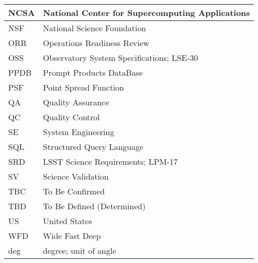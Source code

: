 \begin{longtable}{p{}p{}}
NCSA & National Center for Supercomputing Applications \\\hline
NSF & National Science Foundation \\\hline
ORR & Operations Readiness Review \\\hline
OSS & Observatory System Specifications; LSE-30 \\\hline
PPDB & Prompt Products DataBase \\\hline
PSF & Point Spread Function \\\hline
QA & Quality Assurance \\\hline
QC & Quality Control \\\hline
SE & System Engineering \\\hline
SQL & Structured Query Language \\\hline
SRD & LSST Science Requirements; LPM-17 \\\hline
SV & Science Validation \\\hline
TBC & To Be Confirmed \\\hline
TBD & To Be Defined (Determined) \\\hline
US & United States \\\hline
WFD & Wide Fast Deep \\\hline
deg & degree; unit of angle \\\hline
\end{longtable}
